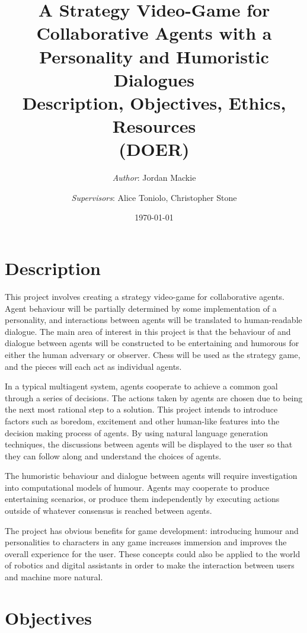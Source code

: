 \documentclass[12pt]{extarticle}
\title{%
  A Strategy Video-Game for Collaborative Agents with a Personality and Humoristic Dialogues \\
  \vspace{5mm} 
  \large Description, Objectives, Ethics, Resources \\
  (DOER)}
\author{\textit{Author}: Jordan Mackie \and 
{\textit{Supervisors}: Alice Toniolo, Christopher Stone}}
\date{\today}
\begin{document}
\maketitle


\section*{Description}

This project involves creating a strategy video-game for collaborative agents. Agent behaviour will be partially determined by some implementation of a personality, and interactions between agents will be translated to human-readable dialogue. The main area of interest in this project is that the behaviour of and dialogue between agents will be constructed to be entertaining and humorous for either the human adversary or observer. Chess will be used as the strategy game, and the pieces will each act as individual agents.

In a typical multiagent system, agents cooperate to achieve a common goal through a series of decisions. The actions taken by agents are chosen due to being the next most rational step to a solution. This project intends to introduce factors such as boredom, excitement and other human-like features into the decision making process of agents. By using natural language generation techniques, the discussions between agents will be displayed to the user so that they can follow along and understand the choices of agents.

The humoristic behaviour and dialogue between agents will require investigation into computational models of humour. Agents may cooperate to produce entertaining scenarios, or produce them independently by executing actions outside of whatever consensus is reached between agents.

The project has obvious benefits for game development: introducing humour and personalities to characters in any game increases immersion and improves the overall experience for the user. These concepts could also be applied to the world of robotics and digital assistants in order to make the interaction between users and machine more natural.

\section*{Objectives}
\end{document}
